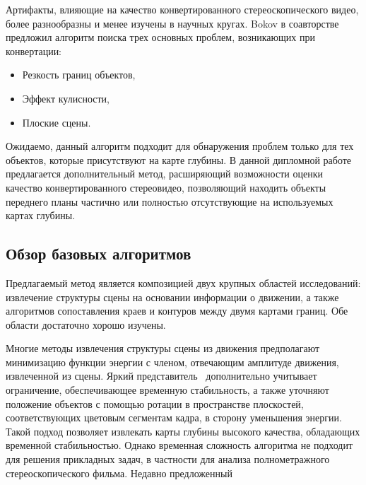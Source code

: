 \documentclass[14pt, a4paper]{extarticle}
\begin{document}
Артифакты, влияющие на качество конвертированного стереоскопического видео, более 
разнообразны и менее изучены в научных кругах. Bokov в соавторстве~\cite{bokov2014automatic} 
предложил алгоритм поиска трех основных проблем, возникающих при конвертации:
\begin{itemize}
	\item Резкость границ объектов,
	\item Эффект кулисности,
	\item Плоские сцены.
\end{itemize}
Ожидаемо, данный алгоритм подходит для обнаружения проблем только для тех объектов, 
которые присутствуют на карте глубины. В данной дипломной работе предлагается 
дополнительный метод, расширяющий возможности оценки качество конвертированного стереовидео,
позволяющий находить объекты переднего планы частично или полностью отсутствующие
на используемых картах глубины.

\subsection{Обзор базовых алгоритмов}

Предлагаемый метод является композицией двух крупных областей исследований: извлечение структуры 
сцены на основании информации о движении, а также алгоритмов сопоставления краев и контуров 
между двумя картами границ. Обе области достаточно хорошо изучены.

Многие методы извлечения структуры сцены из движения предполагают минимизацию функции энергии
с членом, отвечающим амплитуде движения, извлеченной из сцены. Яркий 
представитель~\cite{zhang2009consistent} дополнительно учитывает ограничение, 
обеспечивающее временную стабильность, а также уточняют положение объектов с помощью ротации 
в пространстве плоскостей, соответствующих цветовым сегментам кадра, в сторону уменьшения энергии.
Такой подход позволяет извлекать карты глубины высокого качества, обладающих временной стабильностью.
Однако временная сложность алгоритма не подходит для решения прикладных задач, в частности 
для анализа полнометражного стереоскопического фильма. Недавно предложенный 
\end{document}
